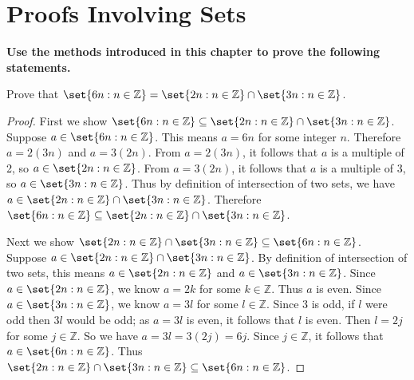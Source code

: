 \documentclass[DIN, pagenumber=false, fontsize=11pt, parskip=half]{scrartcl}
\title{}
\author{} %
\date{}
\begin{document}
\maketitle

\setcounter{section}{7}

\section{Proofs Involving Sets}

\textbf{Use the methods introduced in this chapter to prove the following statements.}

\begin{problems}
    \problem Prove that $\set{6n : n \in \mathbb{Z}} = \set{2n : n \in \mathbb{Z}} \cap \set{3n : n \in \mathbb{Z}}$.
    \begin{proof}
        First we show $\set{6n : n \in \mathbb{Z}} \subseteq \set{2n : n \in \mathbb{Z}} \cap \set{3n : n \in \mathbb{Z}}$.
        Suppose $a \in \set{6n : n \in \mathbb{Z}}$.
        This means $a = 6n$ for some integer $n$.
        Therefore $a = 2(3n)$ and $a = 3(2n)$.
        From $a = 2(3n)$, it follows that $a$ is a multiple of 2,
        so $a \in \set{2n : n \in \mathbb{Z}}$.
        From $a = 3(2n)$, it follows that $a$ is a multiple of 3,
        so $a \in \set{3n : n \in \mathbb{Z}}$.
        Thus by definition of intersection of two sets,
        we have $a \in \set{2n : n \in \mathbb{Z}} \cap \set{3n : n \in \mathbb{Z}}$.
        Therefore $\set{6n : n \in \mathbb{Z}} \subseteq \set{2n : n \in \mathbb{Z}} \cap \set{3n : n \in \mathbb{Z}}$.

        Next we show $\set{2n : n \in \mathbb{Z}} \cap \set{3n : n \in \mathbb{Z}} \subseteq \set{6n : n \in \mathbb{Z}}$.\\ 
        Suppose $a \in \set{2n : n \in \mathbb{Z}} \cap \set{3n : n \in \mathbb{Z}}$.
        By definition of intersection of two sets, this means $a \in \set{2n : n \in \mathbb{Z}}$ and $a \in \set{3n : n \in \mathbb{Z}}$. 
        Since $a \in \set{2n : n \in \mathbb{Z}}$, we know $a = 2k$ for some $k \in \mathbb{Z}$.
        Thus $a$ is even.
        Since $a \in \set{3n : n \in \mathbb{Z}}$, we know $a = 3l$ for some $l \in \mathbb{Z}$.
        Since 3 is odd, if $l$ were odd then $3l$ would be odd; as $a = 3l$ is even, it follows that $l$ is even.
        Then $l = 2j$ for some $j \in \mathbb{Z}$.
        So we have $a = 3l = 3(2j) = 6j$.
        Since $j \in \mathbb{Z}$, it follows that $a \in \set{6n : n \in \mathbb{Z}}$.
        Thus $\set{2n : n \in \mathbb{Z}} \cap \set{3n : n \in \mathbb{Z}} \subseteq \set{6n : n \in \mathbb{Z}}$.


\end{proof}
\end{problems}
\end{document}
